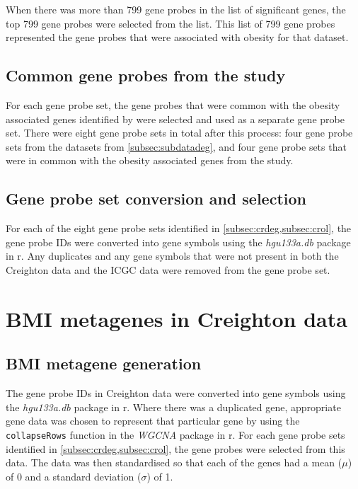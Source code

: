 When there was more than 799 gene probes in the list of significant genes, the top 799 gene probes were selected from the list.
This list of 799 gene probes represented the gene probes that were associated with obesity  for that dataset.

\subsection{Common gene probes from the \citet{Creighton2012} study}
\label{subsec:crol}

For each gene probe set, the gene probes that were common with the obesity associated genes identified by \citet{Creighton2012} were selected and used as a separate gene probe set.
There were eight gene probe sets in total after this process: four gene probe sets from the datasets from \cref{subsec:subdatadeg}, and four gene probe sets that were in common with the obesity associated genes from the \citet{Creighton2012} study.


\subsection{Gene probe set conversion and selection}
\label{subsec:gpconv}

For each of the eight gene probe sets identified in \cref{subsec:crdeg,subsec:crol}, the gene probe IDs were converted into gene symbols using the \textit{hgu133a.db} package in \gls{r}.
Any duplicates and any gene symbols that were not present in both the Creighton data and the ICGC data were removed from the gene probe set.

\section{BMI metagenes in Creighton data}
\label{sec:bmidegmetacr}

\subsection{BMI metagene generation}
\label{subsec:bmimetagen}

The gene probe IDs in Creighton data were converted into gene symbols using the \textit{hgu133a.db} package in \gls{r}.
Where there was a duplicated gene, appropriate gene data was chosen to represent that particular gene by using the \texttt{collapseRows} function in the \textit{WGCNA} package in \gls{r}.
For each gene probe sets identified in \cref{subsec:crdeg,subsec:crol}, the gene probes were selected from this data.
The data was then standardised so that each of the genes had a mean ($\mu$) of 0 and a standard deviation ($\sigma$) of 1.

